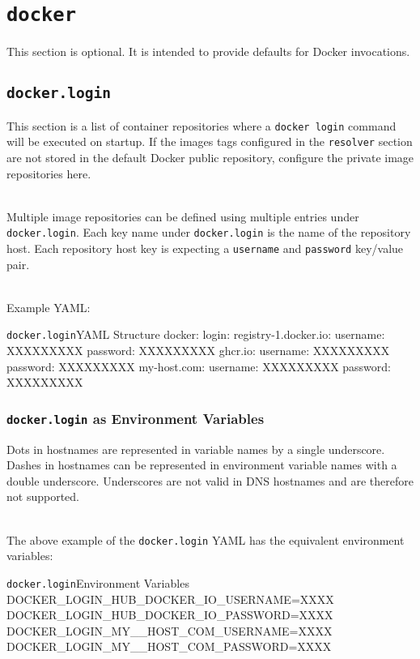 \section{\texttt{docker}}

This section is optional.  It is intended to provide defaults for Docker invocations.

\subsection{\texttt{docker.login}}

This section is a list of container repositories where a \texttt{docker login} command will be 
executed on \cxflowplusplus startup.  If the images tags configured in the \texttt{resolver}
section are not stored in the default Docker public repository, configure the private 
image repositories here.

\noindent\\Multiple image repositories can be defined using multiple entries under 
\texttt{docker.login}.  Each key name under \texttt{docker.login} is the name of the
repository host.  Each repository host key is expecting a \texttt{username} and
\texttt{password} key/value pair.

\noindent\\Example YAML:\\

\begin{code}{\texttt{docker.login}}{YAML Structure}{}
docker:
    login:
        registry-1.docker.io:
            username: XXXXXXXXX
            password: XXXXXXXXX
        ghcr.io:
            username: XXXXXXXXX
            password: XXXXXXXXX
        my-host.com:
            username: XXXXXXXXX
            password: XXXXXXXXX
\end{code}

\subsubsection{\texttt{docker.login} as Environment Variables}

Dots in hostnames are represented in variable names by a single underscore.  Dashes in hostnames can be represented 
in environment variable names with a double underscore.  
Underscores are not valid in DNS hostnames and are therefore not supported.

\noindent\\The above example of the \texttt{docker.login} YAML 
has the equivalent environment variables:\\

\begin{code}{\texttt{docker.login}}{Environment Variables}{}
DOCKER_LOGIN_HUB_DOCKER_IO_USERNAME=XXXX
DOCKER_LOGIN_HUB_DOCKER_IO_PASSWORD=XXXX
DOCKER_LOGIN_MY__HOST_COM_USERNAME=XXXX
DOCKER_LOGIN_MY__HOST_COM_PASSWORD=XXXX
\end{code}
